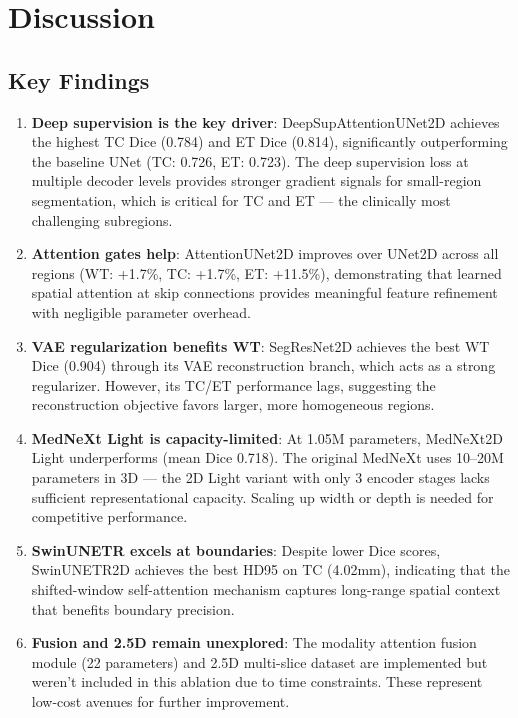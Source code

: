 \documentclass[11pt,a4paper]{article}
\begin{document}
\section{Discussion}

\subsection{Key Findings}
\begin{enumerate}
  \item \textbf{Deep supervision is the key driver}: DeepSupAttentionUNet2D achieves the highest TC Dice (0.784) and ET Dice (0.814), significantly outperforming the baseline UNet (TC: 0.726, ET: 0.723). The deep supervision loss at multiple decoder levels provides stronger gradient signals for small-region segmentation, which is critical for TC and ET — the clinically most challenging subregions.
  
  \item \textbf{Attention gates help}: AttentionUNet2D improves over UNet2D across all regions (WT: +1.7\%, TC: +1.7\%, ET: +11.5\%), demonstrating that learned spatial attention at skip connections provides meaningful feature refinement with negligible parameter overhead.
  
  \item \textbf{VAE regularization benefits WT}: SegResNet2D achieves the best WT Dice (0.904) through its VAE reconstruction branch, which acts as a strong regularizer. However, its TC/ET performance lags, suggesting the reconstruction objective favors larger, more homogeneous regions.
  
  \item \textbf{MedNeXt Light is capacity-limited}: At 1.05M parameters, MedNeXt2D Light underperforms (mean Dice 0.718). The original MedNeXt uses 10--20M parameters in 3D — the 2D Light variant with only 3 encoder stages lacks sufficient representational capacity. Scaling up width or depth is needed for competitive performance.
  
  \item \textbf{SwinUNETR excels at boundaries}: Despite lower Dice scores, SwinUNETR2D achieves the best HD95 on TC (4.02mm), indicating that the shifted-window self-attention mechanism captures long-range spatial context that benefits boundary precision.
  
  \item \textbf{Fusion and 2.5D remain unexplored}: The modality attention fusion module (22 parameters) and 2.5D multi-slice dataset are implemented but weren't included in this ablation due to time constraints. These represent low-cost avenues for further improvement.
\end{enumerate}
\end{document}
